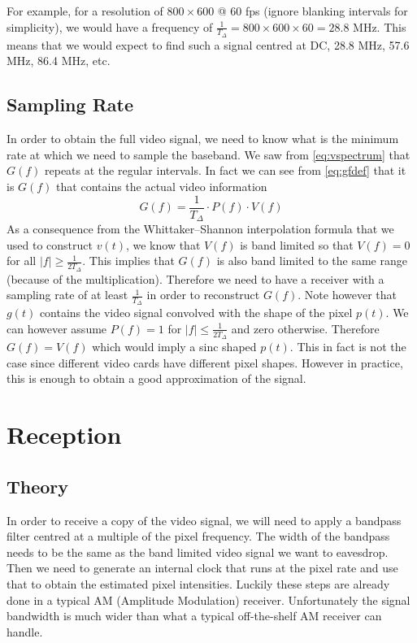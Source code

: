 \documentclass[a4paper,12pt,twoside,openright]{report}
\begin{document}
For example, for a resolution of $800 \times 600 $ @ $ 60$ fps (ignore blanking intervals for simplicity), we would have a frequency of $\frac{1}{T_{\Delta}} = 800 \times 600 \times 60 = 28.8$ MHz. This means that we would expect to find such a signal centred at DC, 28.8 MHz, 57.6 MHz, 86.4 MHz, etc.

\subsection{Sampling Rate}

In order to obtain the full video signal, we need to know what is the minimum rate at which we need to sample the baseband. We saw from \ref{eq:vspectrum} that $G(f)$ repeats at the regular intervals. In fact we can see from \ref{eq:gfdef} that it is $G(f)$ that contains the actual video information
$$G(f) = \frac{1}{T_{\Delta}} \cdot P(f) \cdot V(f)$$
As a consequence from the Whittaker--Shannon interpolation formula that we used to construct $v(t)$, we know that $V(f)$ is band limited so that $V(f) = 0$ for all $|f| \geq \frac{1}{2 T_{\Delta}}$. This implies that $G(f)$ is also band limited to the same range (because of the multiplication). Therefore we need to have a receiver with a sampling rate of at least $\frac{1}{T_{\Delta}}$ in order to reconstruct $G(f)$. Note however that $g(t)$ contains the video signal convolved with the shape of the pixel $p(t)$. We can however assume $P(f)=1$ for $|f| \le \frac{1}{2 T_{\Delta}}$ and zero otherwise. Therefore $G(f) = V(f)$ which would imply a sinc shaped $p(t)$. This in fact is not the case since different video cards have different pixel shapes\cite{kuhn2003compromising}. However in practice, this is enough to obtain a good approximation of the signal.

\section{Reception}

\subsection{Theory}
In order to receive a copy of the video signal, we will need to apply a bandpass filter centred at a multiple of the pixel frequency. The width of the bandpass needs to be the same as the band limited video signal we want to eavesdrop. Then we need to generate an internal clock that runs at the pixel rate and use that to obtain the estimated pixel intensities. Luckily these steps are already done in a typical AM (Amplitude Modulation) receiver. Unfortunately the signal bandwidth is much wider than what a typical off-the-shelf AM receiver can handle.
\end{document}
